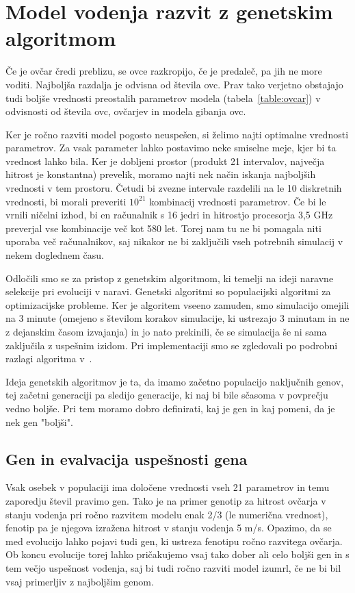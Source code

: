\section{Model vodenja razvit z genetskim algoritmom} \label{genetski}

Če je ovčar čredi preblizu, se ovce razkropijo, če je predaleč, pa jih ne more voditi. Najboljša razdalja je odvisna od števila ovc. Prav tako verjetno obstajajo tudi boljše vrednosti preostalih parametrov modela (tabela~\ref{table:ovcar}) v odvisnosti od števila ovc, ovčarjev in modela gibanja ovc.

Ker je ročno razviti model pogosto neuspešen, si želimo najti optimalne vrednosti parametrov. Za vsak parameter lahko postavimo neke smiselne meje, kjer bi ta vrednost lahko bila. Ker je dobljeni prostor (produkt 21 intervalov, največja hitrost je konstantna) prevelik, moramo najti nek način iskanja najboljših vrednosti v tem prostoru. Četudi bi zvezne intervale razdelili na le 10 diskretnih vrednosti, bi morali preveriti $10^{21}$ kombinacij vrednosti parametrov. Če bi le vrnili ničelni izhod, bi en računalnik s 16 jedri in hitrostjo procesorja 3,5 GHz preverjal vse kombinacije več kot 580 let. Torej nam tu ne bi pomagala niti uporaba več računalnikov, saj nikakor ne bi zaključili vseh potrebnih simulacij v nekem doglednem času.

Odločili smo se za pristop z genetskim algoritmom, ki temelji na ideji naravne selekcije pri evoluciji v naravi. Genetski algoritmi so populacijski algoritmi za optimizacijske probleme. Ker je algoritem vseeno zamuden, smo simulacijo omejili na 3 minute (omejeno s številom korakov simulacije, ki ustrezajo 3 minutam in ne z dejanskim časom izvajanja) in jo nato prekinili, če se simulacija še ni sama zaključila z uspešnim izidom. Pri implementaciji smo se zgledovali po podrobni razlagi algoritma v~\cite{natureOfCode}.

Ideja genetskih algoritmov je ta, da imamo začetno populacijo naključnih genov, tej začetni generaciji pa sledijo generacije, ki naj bi bile sčasoma v povprečju vedno boljše. Pri tem moramo dobro definirati, kaj je gen in kaj pomeni, da je nek gen "boljši".

\subsection{Gen in evalvacija uspešnosti gena}

Vsak osebek v populaciji ima določene vrednosti vseh 21 parametrov in temu zaporedju števil pravimo gen. Tako je na primer genotip za hitrost ovčarja v stanju vodenja pri ročno razvitem modelu enak 2/3 (le numerična vrednost), fenotip pa je njegova izražena hitrost v stanju vodenja 5 m/s. Opazimo, da se med evolucijo lahko pojavi tudi gen, ki ustreza fenotipu ročno razvitega ovčarja. Ob koncu evolucije torej lahko pričakujemo vsaj tako dober ali celo boljši gen in s tem večjo uspešnost vodenja, saj bi tudi ročno razviti model izumrl, če ne bi bil vsaj primerljiv z najboljšim genom.

